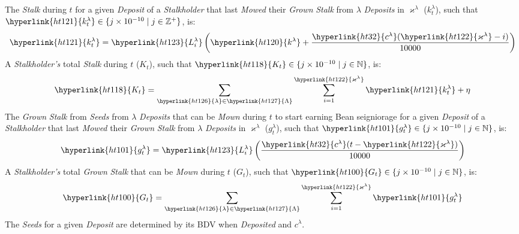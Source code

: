 \documentclass[tikz]{article}
\newcommand{\term}[1]{\textsl{#1}}
\newcommand{\bean}{} %
\begin{document}
The \term{Stalk} during \hyperlink{ht204}{$t$} for a given \term{Deposit} of a \term{Stalkholder} that last \term{Mowed} their \term{Grown} \term{Stalk} from \hyperlink{ht126}{$\lambda$} \term{Deposits} in \hyperlink{ht122}{$\varkappa^{\lambda}$} (\hyperlink{ht121}{$k_{t}^{\lambda}$}), such that $\hyperlink{ht121}{k_{t}^{\lambda}} \in \{j \times 10^{-10} \mid j \in \mathbb{Z}^{+} \}$, is:
$$\hyperlink{ht121}{k_{t}^{\lambda}} = \hyperlink{ht123}{L_i^{\lambda}}\left(\hyperlink{ht120}{k^{\lambda}} + \frac{\hyperlink{ht32}{c^{\lambda}}(\hyperlink{ht122}{\varkappa^{\lambda}} - i)}{10000}\right)$$
A \term{Stalkholder's} total \term{Stalk} during \hyperlink{ht204}{$t$} (\hyperlink{ht118}{$K_t$}), such that $\hyperlink{ht118}{K_t} \in \{j \times 10^{-10} \mid j \in \mathbb{N} \}$, is:
$$\hyperlink{ht118}{K_t} = \sum_{\hyperlink{ht126}{\lambda} \in \hyperlink{ht127}{\Lambda}} \sum_{i=1}^{\hyperlink{ht122}{\varkappa^{\lambda}}} \hyperlink{ht121}{k_{t}^{\lambda}} + \eta^{\bean}$$
The \term{Grown} \term{Stalk} from \term{Seeds} from \hyperlink{ht126}{$\lambda$} \term{Deposits} that can be \term{Mown} during \hyperlink{ht204}{$t$} to start earning Bean seigniorage for a given \term{Deposit} of a \term{Stalkholder} that last \term{Mowed} their \term{Grown} \term{Stalk} from \hyperlink{ht126}{$\lambda$} \term{Deposits} in \hyperlink{ht122}{$\varkappa^{\lambda}$} (\hyperlink{ht101}{$g_{t}^{\lambda}$}), such that $\hyperlink{ht101}{g_{t}^{\lambda}} \in \{j \times 10^{-10} \mid j \in \mathbb{N} \}$, is:
$$\hyperlink{ht101}{g_{t}^{\lambda}} = \hyperlink{ht123}{L_i^{\lambda}}\left(\frac{\hyperlink{ht32}{c^{\lambda}}(t - \hyperlink{ht122}{\varkappa^{\lambda}})}{10000}\right)$$
A \term{Stalkholder's} total \term{Grown} \term{Stalk} that can be \term{Mown} during \hyperlink{ht204}{$t$} (\hyperlink{ht100}{$G_t$}), such that $\hyperlink{ht100}{G_t} \in \{j \times 10^{-10} \mid j \in \mathbb{N} \}$, is:
$$\hyperlink{ht100}{G_t} = \sum_{\hyperlink{ht126}{\lambda} \in \hyperlink{ht127}{\Lambda}} \sum_{i=1}^{\hyperlink{ht122}{\varkappa^{\lambda}}} \hyperlink{ht101}{g_{t}^{\lambda}}$$
The \term{Seeds} for a given \term{Deposit} are determined by its BDV when \term{Deposited} and \hyperlink{ht32}{$c^{\lambda}$}.
\end{document}
